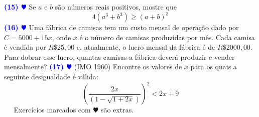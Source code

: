 \documentclass[12pt, a4paper]{article}
\begin{document}
\textcolor{blue}{\bf(15) $\varheart$} Se $a$ e $b$ são números reais positivos, mostre que
\[
4(a^3 + b^3) \ge (a+b)^3
\]
\newline\newline
\textcolor{blue}{\bf(16) $\varheart$} Uma fábrica de camisas tem um custo mensal de operação dado por $C = 5000 + 15x$, onde $x$ é o número de camisas produzidas por mês. Cada camisa é vendida por $R\$ 25,00$ e, atualmente, o lucro mensal da fábrica é de $R\$ 2000,00.$  Para dobrar esse lucro, quantas camisas a fábrica deverá produzir e vender mensalmente?
\newline\newline
\textcolor{blue}{\bf(17) $\varheart$} (IMO 1960) Encontre os valores de $x$ para os quais a seguinte desigualdade é válida:
\[
\left(\frac{2x}{(1 - \sqrt{1 + 2x})}\right)^2 < 2x + 9
\]
\textcolor{white}{Oi}
\newline \newline
Exercícios marcados com $\varheart$ são extras.
\end{document}
